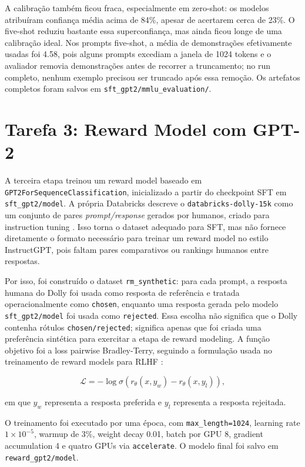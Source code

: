 \documentclass[a4paper,12pt]{article}
\begin{document}
A calibração também ficou fraca, especialmente em zero-shot: os modelos atribuíram confiança média acima de 84\%, apesar de acertarem cerca de 23\%. O five-shot reduziu bastante essa superconfiança, mas ainda ficou longe de uma calibração ideal. Nos prompts five-shot, a média de demonstrações efetivamente usadas foi 4.58, pois alguns prompts excediam a janela de 1024 tokens e o avaliador removia demonstrações antes de recorrer a truncamento; no run completo, nenhum exemplo precisou ser truncado após essa remoção. Os artefatos completos foram salvos em \texttt{sft\_gpt2/mmlu\_evaluation/}.

\section{Tarefa 3: Reward Model com GPT-2}

A terceira etapa treinou um reward model baseado em \texttt{GPT2ForSequenceClassification}, inicializado a partir do checkpoint SFT em \texttt{sft\_gpt2/model}. A própria Databricks descreve o \texttt{databricks-dolly-15k} como um conjunto de pares \textit{prompt/response} gerados por humanos, criado para instruction tuning \cite{databricks2023dolly}. Isso torna o dataset adequado para SFT, mas não fornece diretamente o formato necessário para treinar um reward model no estilo InstructGPT, pois faltam pares comparativos ou rankings humanos entre respostas.

Por isso, foi construído o dataset \texttt{rm\_synthetic}: para cada prompt, a resposta humana do Dolly foi usada como resposta de referência e tratada operacionalmente como \texttt{chosen}, enquanto uma resposta gerada pelo modelo \texttt{sft\_gpt2/model} foi usada como \texttt{rejected}. Essa escolha não significa que o Dolly contenha rótulos \texttt{chosen/rejected}; significa apenas que foi criada uma preferência sintética para exercitar a etapa de reward modeling. A função objetivo foi a loss pairwise Bradley-Terry, seguindo a formulação usada no treinamento de reward models para RLHF \cite{ouyang2022training}:

\[
    \mathcal{L} = -\log \sigma(r_{\theta}(x, y_w) - r_{\theta}(x, y_l)),
\]

em que $y_w$ representa a resposta preferida e $y_l$ representa a resposta rejeitada.

O treinamento foi executado por uma época, com \texttt{max\_length=1024}, learning rate $1 \times 10^{-5}$, warmup de 3\%, weight decay 0.01, batch por GPU 8, gradient accumulation 4 e quatro GPUs via \texttt{accelerate}. O modelo final foi salvo em \texttt{reward\_gpt2/model}.
\end{document}
